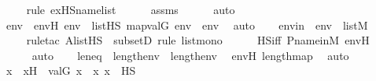 \begin{isabellebody}
\ \ \ \ \isamarkupfalse%
{\isacharparenleft}{\kern0pt}rule\ ex{\isacharunderscore}{\kern0pt}HS{\isacharunderscore}{\kern0pt}name{\isacharunderscore}{\kern0pt}list{\isacharparenright}{\kern0pt}\isanewline
\ \ \ \ \isamarkupfalse%
\ assms\isanewline
\ \ \ \ \isamarkupfalse%
\ auto\isanewline
\ \ \isamarkupfalse%
\ \isamarkupfalse%
\ env{\isacharprime}{\kern0pt}\ \ env{\isacharprime}{\kern0pt}H{\isacharcolon}{\kern0pt}\ {\isachardoublequoteopen}env{\isacharprime}{\kern0pt}\ {\isasymin}\ list{\isacharparenleft}{\kern0pt}HS{\isacharparenright}{\kern0pt}{\isachardoublequoteclose}\ {\isachardoublequoteopen}map{\isacharparenleft}{\kern0pt}val{\isacharparenleft}{\kern0pt}G{\isacharparenright}{\kern0pt}{\isacharcomma}{\kern0pt}\ env{\isacharprime}{\kern0pt}{\isacharparenright}{\kern0pt}\ {\isacharequal}{\kern0pt}\ env{\isachardoublequoteclose}\ \isamarkupfalse%
\ auto\isanewline
\isanewline
\ \ \isamarkupfalse%
\ env{\isacharprime}{\kern0pt}in\ {\isacharcolon}{\kern0pt}\ {\isachardoublequoteopen}env{\isacharprime}{\kern0pt}\ {\isasymin}\ list{\isacharparenleft}{\kern0pt}M{\isacharparenright}{\kern0pt}{\isachardoublequoteclose}\ \isanewline
\ \ \ \ \isamarkupfalse%
{\isacharparenleft}{\kern0pt}rule{\isacharunderscore}{\kern0pt}tac\ A{\isacharequal}{\kern0pt}{\isachardoublequoteopen}list{\isacharparenleft}{\kern0pt}HS{\isacharparenright}{\kern0pt}{\isachardoublequoteclose}\ \ subsetD{\isacharcomma}{\kern0pt}\ rule\ list{\isacharunderscore}{\kern0pt}mono{\isacharparenright}{\kern0pt}\isanewline
\ \ \ \ \isamarkupfalse%
\ HS{\isacharunderscore}{\kern0pt}iff\ P{\isacharunderscore}{\kern0pt}name{\isacharunderscore}{\kern0pt}in{\isacharunderscore}{\kern0pt}M\ env{\isacharprime}{\kern0pt}H\ \isanewline
\ \ \ \ \isamarkupfalse%
\ auto\isanewline
\isanewline
\ \ \isamarkupfalse%
\ leneq\ {\isacharcolon}{\kern0pt}\ {\isachardoublequoteopen}length{\isacharparenleft}{\kern0pt}env{\isacharprime}{\kern0pt}{\isacharparenright}{\kern0pt}\ {\isacharequal}{\kern0pt}\ length{\isacharparenleft}{\kern0pt}env{\isacharparenright}{\kern0pt}{\isachardoublequoteclose}\ \isamarkupfalse%
\ env{\isacharprime}{\kern0pt}H\ length{\isacharunderscore}{\kern0pt}map\ \isamarkupfalse%
\ auto\isanewline
\isanewline
\ \ \isamarkupfalse%
\ x{\isacharprime}{\kern0pt}\ \ x{\isacharprime}{\kern0pt}H\ {\isacharcolon}{\kern0pt}\ {\isachardoublequoteopen}val{\isacharparenleft}{\kern0pt}G{\isacharcomma}{\kern0pt}\ x{\isacharprime}{\kern0pt}{\isacharparenright}{\kern0pt}\ {\isacharequal}{\kern0pt}\ x{\isachardoublequoteclose}\ {\isachardoublequoteopen}x{\isacharprime}{\kern0pt}\ {\isasymin}\ HS{\isachardoublequoteclose}\ \isamarkupfalse%

\end{isabellebody}
